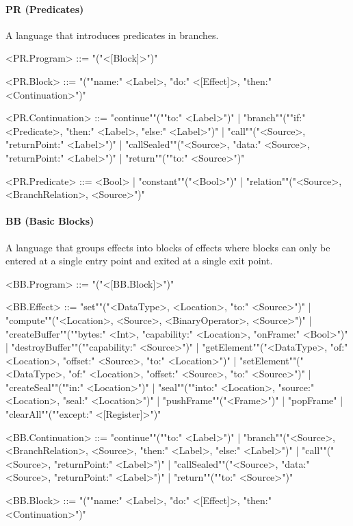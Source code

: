 \documentclass[main.tex]{subfiles}
\begin{document}
\paragraph{ PR (Predicates) } A language that introduces predicates in branches.
\begin{grammar}
	\footnotesize
				<PR.Program> ::=
							"("<[Block]>")"
				\par
				<PR.Block> ::=
							"(""name:" <Label>, "do:" <[Effect]>, "then:" <Continuation>")"
				\par
				<PR.Continuation> ::=
						"continue""(""to:" <Label>")"
						| "branch""(""if:" <Predicate>, "then:" <Label>, "else:" <Label>")"
						| "call""("<Source>, "returnPoint:" <Label>")"
						| "callSealed""("<Source>, "data:" <Source>, "returnPoint:" <Label>")"
						| "return""(""to:" <Source>")"
				\par
				<PR.Predicate> ::=
						<Bool> |
						"constant""("<Bool>")"
						| "relation""("<Source>, <BranchRelation>, <Source>")"
				\par
\end{grammar}
\par
\paragraph{ BB (Basic Blocks) } A language that groups effects into blocks of effects where blocks can only be entered at a single entry point and exited at a single exit point.
\begin{grammar}
	\footnotesize
				<BB.Program> ::=
							"("<[BB.Block]>")"
				\par
				<BB.Effect> ::=
						"set""("<DataType>, <Location>, "to:" <Source>")"
						| "compute""("<Location>, <Source>, <BinaryOperator>, <Source>")"
						| "createBuffer""(""bytes:" <Int>, "capability:" <Location>, "onFrame:" <Bool>")"
						| "destroyBuffer""(""capability:" <Source>")"
						| "getElement""("<DataType>, "of:" <Location>, "offset:" <Source>, "to:" <Location>")"
						| "setElement""("<DataType>, "of:" <Location>, "offset:" <Source>, "to:" <Source>")"
						| "createSeal""(""in:" <Location>")"
						| "seal""(""into:" <Location>, "source:" <Location>, "seal:" <Location>")"
						| "pushFrame""("<Frame>")"
						| "popFrame"
						| "clearAll""(""except:" <[Register]>")"
				\par
				<BB.Continuation> ::=
						"continue""(""to:" <Label>")"
						| "branch""("<Source>, <BranchRelation>, <Source>, "then:" <Label>, "else:" <Label>")"
						| "call""("<Source>, "returnPoint:" <Label>")"
						| "callSealed""("<Source>, "data:" <Source>, "returnPoint:" <Label>")"
						| "return""(""to:" <Source>")"
				\par
				<BB.Block> ::=
							"(""name:" <Label>, "do:" <[Effect]>, "then:" <Continuation>")"
				\par
\end{grammar}
\par
\end{document}
